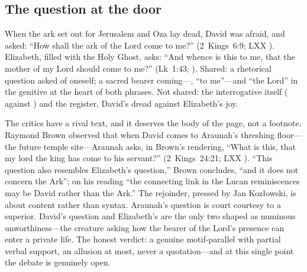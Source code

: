 \subsection{The question at the door}

When the ark set out for Jerusalem and Oza lay dead, David was afraid,
and asked: ``How shall the ark of the Lord come to me?''
(2~Kings~6:9; LXX ).
Elizabeth, filled with the Holy Ghost, asks: ``And whence is this to me,
that the mother of my Lord should come to me?'' (Lk~1:43; ). Shared: a rhetorical
question asked of oneself; a sacred bearer coming---, ``to
me''---and ``the Lord'' in the genitive at the heart of both phrases. Not
shared: the interrogative itself ( against ) and the register, David's dread against Elizabeth's joy.

The critics have a rival text, and it deserves the body of the page, not
a footnote. Raymond Brown observed that when David comes to
Araunah's threshing floor---the future temple site---Araunah asks, in
Brown's rendering, ``What is this, that my lord the king has come to his
servant?'' (2~Kings~24:21; LXX ). ``This question also resembles Elizabeth's question,'' Brown
concludes, ``and it does not concern the Ark''; on his reading ``the
connecting link in the Lucan reminiscences may be David rather than the
Ark.'' The rejoinder, pressed by Jan
Kozłowski, is about content rather than syntax. Araunah's question is
court courtesy to a superior. David's question and Elizabeth's are the
only two shaped as numinous unworthiness---the creature asking how the
bearer of the Lord's presence can enter a private life. The honest verdict:
a genuine motif-parallel with partial verbal support, an allusion at
most, never a quotation---and at this single point the debate is
genuinely open.

